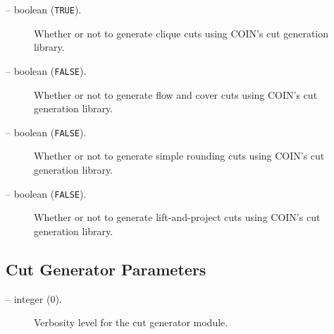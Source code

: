 \begin{description}
\item[ -- boolean ({\tt TRUE}).] 
Whether or not to generate clique cuts using COIN's cut generation library. 

\item[ -- boolean ({\tt FALSE}).] 
Whether or not to generate flow and cover cuts using COIN's cut generation 
library. 

\item[ -- boolean ({\tt FALSE}).] 
Whether or not to generate simple rounding cuts using COIN's cut generation 
library. 

\item[ -- boolean ({\tt FALSE}).] 
Whether or not to generate lift-and-project cuts using COIN's cut generation 
library. 

\end{description}
\subsection{Cut Generator Parameters}

\begin{description}

\item[ -- integer (0).] 
Verbosity level for the cut generator module.

\end{description}

